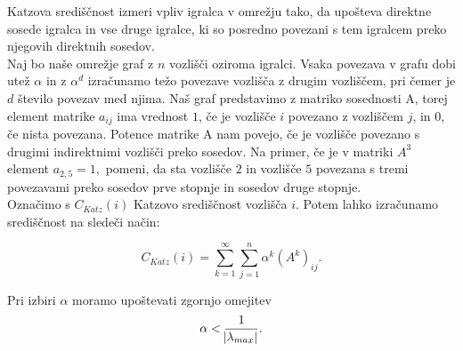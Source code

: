 \documentclass[a4paper]{article}
\begin{document}
\hspace{4.8mm}Katzova središčnost izmeri vpliv igralca v omrežju tako, da upošteva direktne sosede igralca in vse druge igralce, ki so posredno povezani s tem igralcem preko njegovih direktnih sosedov. \\
Naj bo naše omrežje graf z $n$ vozlišči oziroma igralci. Vsaka povezava v grafu dobi utež $\alpha$ in z $\alpha^{d}$ izračunamo težo povezave vozlišča z drugim vozliščem, pri čemer je $d$ število povezav med njima. Naš graf predstavimo z matriko sosednosti A, torej element matrike $a_{ij}$ ima vrednost $1$, če je vozlišče $i$ povezano z vozliščem $j$, in $0$, če nista povezana. Potence matrike A nam povejo, če je vozlišče povezano s drugimi indirektnimi vozlišči preko sosedov. Na primer, če je v matriki $A^{3}$ element $a_{2,5}  = 1,$ pomeni, da sta vozlišče $2$ in vozlišče $5$ povezana s tremi povezavami preko sosedov prve stopnje in sosedov druge stopnje. \\
Označimo s $C_{Katz}(i)$ Katzovo središčnost vozlišča $i$. Potem lahko izračunamo središčnost na sledeči način:

$$C_{Katz}(i) = \sum_{k=1}^{\infty}\sum_{j=1}^{n}\alpha^{k}(A^{k})_{ij}.$$

Pri izbiri $\alpha$ moramo upoštevati zgornjo omejitev $$\alpha < \frac{1}{\abs{\lambda_{max}}}.$$
\end{document}
